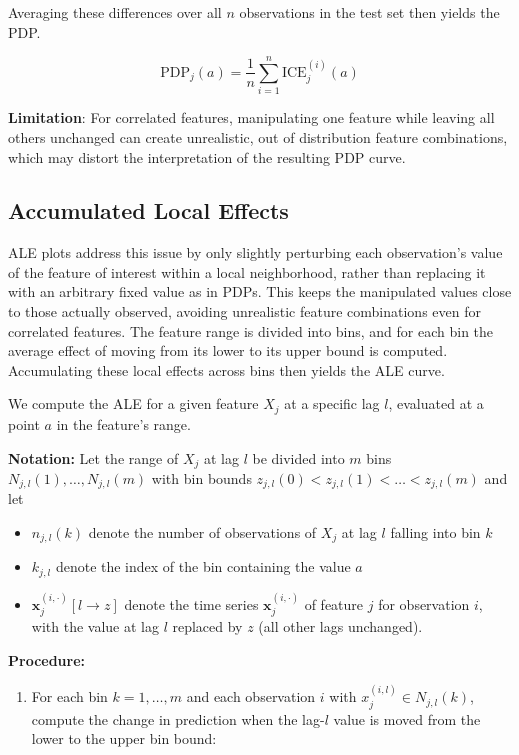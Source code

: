 \documentclass[
]{krantz}
\providecommand{\tightlist}{%
  \setlength{\itemsep}{0pt}\setlength{\parskip}{0pt}}
\begin{document}
Averaging these differences over all \(n\) observations in the test set then yields the PDP.

\[
\mathrm{PDP}_j(a) = \frac{1}{n} \sum_{i=1}^n \mathrm{ICE}_j^{(i)}(a)
\]

\textbf{Limitation}: For correlated features, manipulating one feature while leaving all others unchanged can create unrealistic, out of distribution feature combinations, which may distort the interpretation of the resulting PDP curve.

\newpage

\subsection{Accumulated Local Effects}\label{accumulated-local-effects}

ALE plots address this issue by only slightly perturbing each observation's value of the feature of interest within a local neighborhood, rather than replacing it with an arbitrary fixed value as in PDPs. This keeps the manipulated values close to those actually observed, avoiding unrealistic feature combinations even for correlated features. The feature range is divided into bins, and for each bin the average effect of moving from its lower to its upper bound is computed. Accumulating these local effects across bins then yields the ALE curve.

We compute the ALE for a given feature \(X_j\) at a specific lag \(l\), evaluated at a point \(a\) in the feature's range.

\textbf{Notation:} Let the range of \(X_j\) at lag \(l\) be divided into \(m\) bins \(N_{j, l}(1), \dots, N_{j, l}(m)\) with bin bounds \(z_{j, l}(0) < z_{j, l}(1) < \dots < z_{j, l}(m)\) and let

\begin{itemize}
\tightlist
\item
  \(n_{j, l}(k)\) denote the number of observations of \(X_j\) at lag \(l\) falling into bin \(k\)
\item
  \(k_{j, l}\) denote the index of the bin containing the value \(a\)
\item
  \(\boldsymbol x_j^{(i, \cdot)}[l \to z]\) denote the time series \(\boldsymbol x_j^{(i, \cdot)}\) of feature \(j\) for observation \(i\), with the value at lag \(l\) replaced by \(z\) (all other lags unchanged).
\end{itemize}

\textbf{Procedure:}

\begin{enumerate}
\def\labelenumi{\arabic{enumi}.}
\tightlist
\item
  For each bin \(k = 1, \dots, m\) and each observation \(i\) with \(x_j^{(i, l)} \in N_{j, l}(k)\), compute the change in prediction when the lag-\(l\) value is moved from the lower to the upper bin bound:
\end{enumerate}
\end{document}
